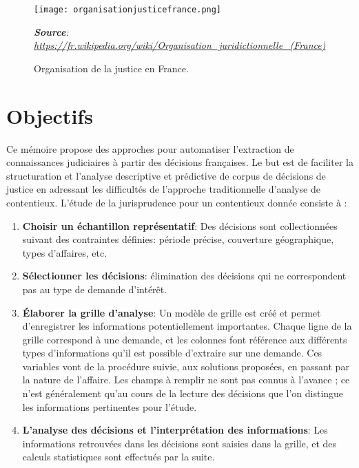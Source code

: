 \begin{figure}[!htb]
	\centering \texttt{[image: organisationjusticefrance.png]}
	
	\textit{\scriptsize{\textbf{Source}: \url{https://fr.wikipedia.org/wiki/Organisation_juridictionnelle_(France)}}}  
	\caption{Organisation de la justice en France.} \label{fig:intro:orgjusticefrance}
\end{figure}

\section{Objectifs}
 Ce mémoire propose des approches pour automatiser l'extraction de connaissances judiciaires à partir des décisions françaises. Le but est de faciliter la structuration et l'analyse descriptive et prédictive de corpus de décisions de justice en adressant les difficultés de l'approche traditionnelle d'analyse de contentieux. L'étude de la jurisprudence pour un contentieux donnée consiste à \citep{ancel2003expulsion} :
 \begin{enumerate}
 	\item \textbf{Choisir un échantillon représentatif}: Des décisions sont collectionnées suivant des contraintes définies:  période précise, couverture géographique, types d'affaires, etc.
 	\item \textbf{Sélectionner les décisions}: élimination des décisions qui ne correspondent pas au type de demande d'intérêt.
 	\item \textbf{Élaborer la grille d'analyse}: Un modèle de grille est créé et permet d'enregistrer les informations potentiellement importantes. Chaque ligne de la grille correspond à une demande, et les colonnes font référence aux différents types d'informations qu'il est possible d'extraire sur une demande. Ces variables vont de la procédure suivie, aux solutions proposées, en passant par la nature de l'affaire. Les champs à remplir ne sont pas connus à l'avance ; ce n'est généralement qu'au cours de la lecture des décisions que l'on distingue les informations pertinentes pour l'étude.
 	\item \textbf{L'analyse des décisions et l'interprétation des informations}: Les informations retrouvées dans les décisions sont saisies dans la grille, et des calculs statistiques sont effectués par la suite.
 \end{enumerate}
 
